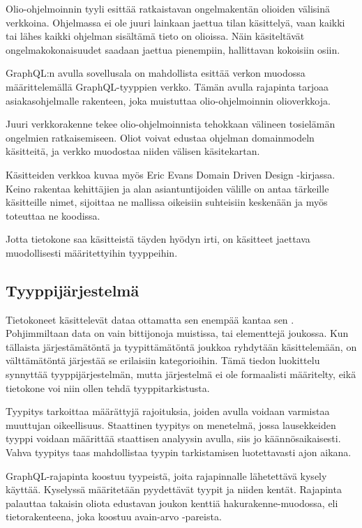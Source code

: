 Olio-ohjelmoinnin tyyli esittää ratkaistavan ongelmakentän olioiden
välisinä verkkoina. Ohjelmassa ei ole juuri lainkaan jaettua tilan
käsittelyä, vaan kaikki tai lähes kaikki ohjelman sisältämä tieto on
olioissa. Näin käsiteltävät ongelmakokonaisuudet saadaan jaettua
pienempiin, hallittavan kokoisiin osiin. \cite{booch2008object}

GraphQL:n avulla sovellusala on mahdollista esittää verkon muodossa
määrittelemällä GraphQL-tyyppien verkko. Tämän avulla rajapinta tarjoaa
asiakasohjelmalle rakenteen, joka muistuttaa olio-ohjelmoinnin
olioverkkoja.\cite{thinkingInGraphs}

Juuri verkkorakenne tekee olio-ohjelmoinnista tehokkaan välineen
tosielämän ongelmien ratkaisemiseen. Oliot voivat edustaa ohjelman
\gls{domainmodel}n käsitteitä, ja verkko muodostaa niiden välisen
käsitekartan.

Käsitteiden verkkoa kuvaa myös Eric Evans Domain Driven Design
-kirjassa. Keino rakentaa  kehittäjien ja alan
asiantuntijoiden välille on antaa tärkeille käsitteille nimet, sijoittaa
ne mallissa oikeisiin suhteisiin keskenään ja myös toteuttaa ne
koodissa.

Jotta tietokone saa käsitteistä täyden hyödyn irti, on käsitteet
jaettava muodollisesti määritettyihin tyyppeihin.

\hypertarget{tyyppijuxe4rjestelmuxe4}{%
\subsection{Tyyppijärjestelmä}\label{tyyppijuxe4rjestelmuxe4}}

Tietokoneet käsittelevät dataa ottamatta sen enempää kantaa sen
. Pohjimmiltaan data on vain bittijonoja
muistissa, tai elementtejä joukossa. Kun tällaista järjestämätöntä ja
tyypittämätöntä joukkoa ryhdytään käsittelemään, on välttämätöntä
järjestää se erilaisiin kategorioihin. Tämä tiedon luokittelu synnyttää
tyyppijärjestelmän, mutta järjestelmä ei ole formaalisti määritelty,
eikä tietokone voi niin ollen tehdä tyyppitarkistusta.

Tyypitys tarkoittaa määrättyjä rajoituksia, joiden avulla voidaan
varmistaa muuttujan oikeellisuus. Staattinen tyypitys on menetelmä,
jossa lausekkeiden tyyppi voidaan määrittää staattisen analyysin avulla,
siis jo käännösaikaisesti. Vahva tyypitys taas mahdollistaa tyypin
tarkistamisen luotettavasti ajon aikana. \cite{Cardelli+Wegner:1985}

GraphQL-rajapinta koostuu tyypeistä, joita rajapinnalle lähetettävä
kysely käyttää. Kyselyssä määritetään pyydettävät tyypit ja niiden
kentät. Rajapinta palauttaa takaisin oliota edustavan joukon kenttiä
\gls{hakurakenne}-muodossa, eli tietorakenteena, joka koostuu avain-arvo
-pareista. \cite{graphql:spec}

